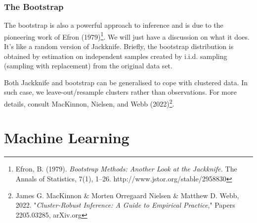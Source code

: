 \documentclass[11pt,a4paper]{amsart}
\theoremstyle{plain}
\theoremstyle{definition}
\begin{document}
\subsubsection{The Bootstrap}
	The bootstrap is also a powerful approach to inference and is due to the pioneering work of Efron (1979)\footnote{Efron, B. (1979). \textit{Bootstrap Methods: Another Look at the Jackknife.} The Annals of Statistics, 7(1), 1–26. http://www.jstor.org/stable/2958830}. We will just have a discussion on what it does. It's like a random version of Jackknife. Brieﬂy, the bootstrap distribution is obtained by estimation on independent samples created by i.i.d. sampling (sampling with replacement) from the original data set. \par 
	Both Jackknife and bootstrap can be generalised to cope with clustered data. In such case, we leave-out/resample clusters rather than observations. For more details, consult MacKinnon, Nielsen, and Webb (2022)\footnote{James G. MacKinnon \& Morten {O}rregaard Nielsen \& Matthew D. Webb, 2022. "\textit{Cluster-Robust Inference: A Guide to Empirical Practice}," Papers 2205.03285, arXiv.org}.

\section{Machine Learning}
\end{document}
